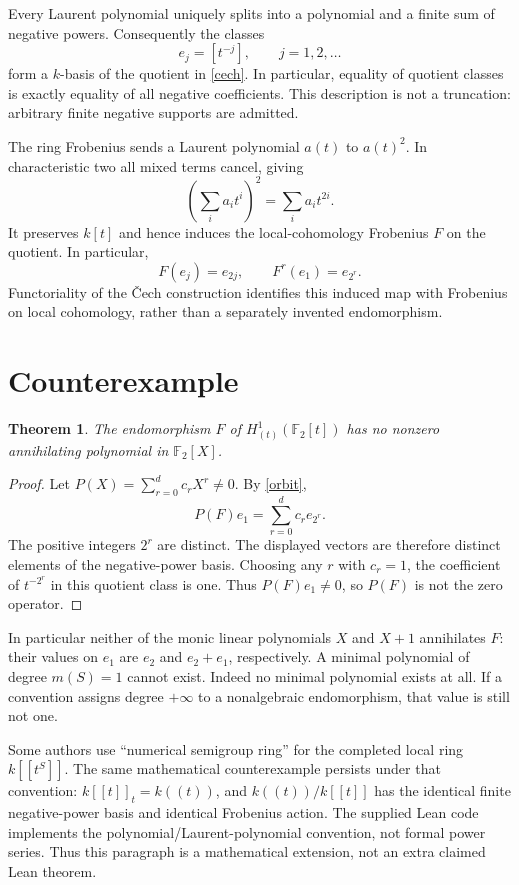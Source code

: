 \documentclass[11pt]{article}
\newtheorem{theorem}{Theorem}
\begin{document}
Every Laurent polynomial uniquely splits into a polynomial and a finite sum of negative powers. Consequently the classes
\[
 e_j=[t^{-j}],\qquad j=1,2,\ldots
\]
form a $k$-basis of the quotient in \eqref{cech}. In particular, equality of quotient classes is exactly equality of all negative coefficients. This description is not a truncation: arbitrary finite negative supports are admitted.

The ring Frobenius sends a Laurent polynomial $a(t)$ to $a(t)^2$. In characteristic two all mixed terms cancel, giving
\[
 \left(\sum_i a_i t^i\right)^2=\sum_i a_i t^{2i}.
\]
It preserves $k[t]$ and hence induces the local-cohomology Frobenius $F$ on the quotient. In particular,
\begin{equation}\label{orbit}
 F(e_j)=e_{2j},\qquad F^r(e_1)=e_{2^r}.
\end{equation}
Functoriality of the \v Cech construction identifies this induced map with Frobenius on local cohomology, rather than a separately invented endomorphism.

\section{Counterexample}
\begin{theorem}
The endomorphism $F$ of $H^1_{(t)}(\mathbb F_2[t])$ has no nonzero annihilating polynomial in $\mathbb F_2[X]$.
\end{theorem}
\begin{proof}
Let $P(X)=\sum_{r=0}^d c_rX^r\ne0$. By \eqref{orbit},
\[
P(F)e_1=\sum_{r=0}^d c_r e_{2^r}.
\]
The positive integers $2^r$ are distinct. The displayed vectors are therefore distinct elements of the negative-power basis. Choosing any $r$ with $c_r=1$, the coefficient of $t^{-2^r}$ in this quotient class is one. Thus $P(F)e_1\ne0$, so $P(F)$ is not the zero operator.
\end{proof}

In particular neither of the monic linear polynomials $X$ and $X+1$ annihilates $F$: their values on $e_1$ are $e_2$ and $e_2+e_1$, respectively. A minimal polynomial of degree $m(S)=1$ cannot exist. Indeed no minimal polynomial exists at all. If a convention assigns degree $+\infty$ to a nonalgebraic endomorphism, that value is still not one.

Some authors use ``numerical semigroup ring'' for the completed local ring $k[[t^S]]$. The same mathematical counterexample persists under that convention: $k[[t]]_t=k((t))$, and $k((t))/k[[t]]$ has the identical finite negative-power basis and identical Frobenius action. The supplied Lean code implements the polynomial/Laurent-polynomial convention, not formal power series. Thus this paragraph is a mathematical extension, not an extra claimed Lean theorem.
\end{document}
